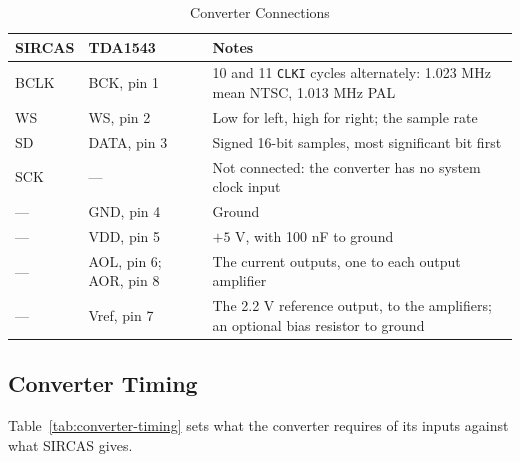 \begin{table}[H]
	\centering
	\small
	\begin{tabular}{llp{6.4cm}}
		\toprule
		\textbf{SIRCAS} & \textbf{TDA1543}       & \textbf{Notes}                                                                     \\
		\midrule
		BCLK            & BCK, pin 1             & 10 and 11 \texttt{CLKI} cycles alternately: 1.023 MHz mean NTSC, 1.013 MHz PAL     \\
		WS              & WS, pin 2              & Low for left, high for right; the sample rate                                      \\
		SD              & DATA, pin 3            & Signed 16-bit samples, most significant bit first                                  \\
		SCK             & ---                    & Not connected: the converter has no system clock input                             \\
		---             & GND, pin 4             & Ground                                                                             \\
		---             & VDD, pin 5             & $+5$ V, with 100 nF to ground                                                      \\
		---             & AOL, pin 6; AOR, pin 8 & The current outputs, one to each output amplifier                                  \\
		---             & Vref, pin 7            & The 2.2 V reference output, to the amplifiers; an optional bias resistor to ground \\
		\bottomrule
	\end{tabular}
	\caption{Converter Connections}
	\label{tab:converter-nets}
\end{table}

\subsection{Converter Timing}

Table~\ref{tab:converter-timing} sets what the converter requires of its inputs against what SIRCAS gives.

